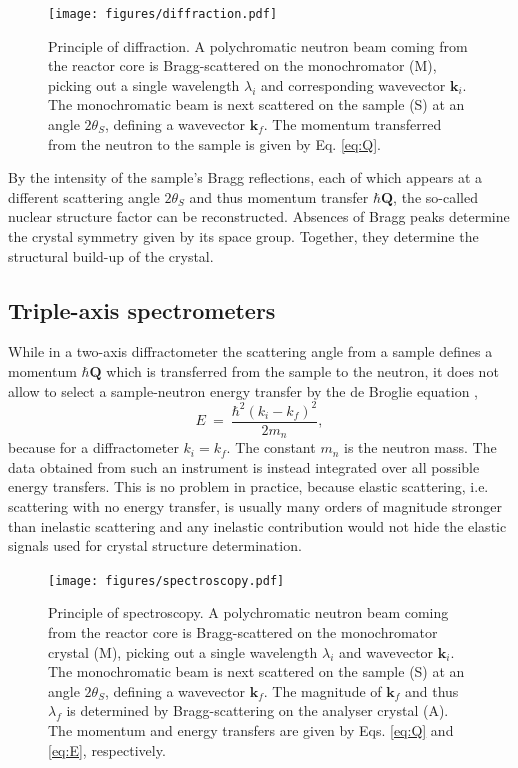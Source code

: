 \begin{figure}[htb]
	\centering
	\texttt{[image: figures/diffraction.pdf]}
	\caption{Principle of diffraction. A polychromatic neutron beam coming from the reactor core is Bragg-scattered on the monochromator (M), picking out a single wavelength $\lambda_i$ and corresponding wavevector $\bm{k}_i$. The monochromatic beam is next scattered on the sample (S) at an angle $2\theta_S$, defining a wavevector $\bm{k}_f$. The momentum transferred from the neutron to the sample is given by Eq. \ref{eq:Q}.}
	\label{fig:diffraction}
\end{figure}

By the intensity of the sample's Bragg reflections, each of which appears at a different scattering angle $2\theta_S$ and thus momentum transfer $\hbar \bm{Q}$, the so-called nuclear structure factor can be reconstructed. Absences of Bragg peaks determine the crystal symmetry given by its space group. Together, they determine the structural build-up of the crystal.


\subsection{Triple-axis spectrometers}

While in a two-axis diffractometer the scattering angle from a sample defines a momentum $\hbar \bm{Q}$ which is transferred from the sample to the neutron, it does not allow to select a sample-neutron energy transfer by the de Broglie equation \cite[p. 89]{Gross2012},
\begin{equation}
	\label{eq:E}
	E \ =\  \frac{\hbar^2 \left(k_i - k_f\right)^2}{2 m_n},
\end{equation}
because for a diffractometer $k_i = k_f$. The constant $m_n$ is the neutron mass.
The data obtained from such an instrument is instead integrated over all possible energy transfers. This is no problem in practice, because elastic scattering, i.e. scattering with no energy transfer, is usually many orders of magnitude stronger than inelastic scattering and any inelastic contribution would not hide the elastic signals used for crystal structure determination.

\begin{figure}[htb]
	\centering
	\texttt{[image: figures/spectroscopy.pdf]}
	\caption{Principle of spectroscopy. A polychromatic neutron beam coming from the reactor core is Bragg-scattered on the monochromator crystal (M), picking out a single wavelength $\lambda_i$ and wavevector $\bm{k}_i$. The monochromatic beam is next scattered on the sample (S) at an angle $2\theta_S$, defining a wavevector $\bm{k}_f$. The magnitude of $\bm{k}_f$ and thus $\lambda_f$ is determined by Bragg-scattering on the analyser crystal (A). The momentum and energy transfers are given by Eqs. \ref{eq:Q} and \ref{eq:E}, respectively. }
	\label{fig:spectroscopy}
\end{figure}


